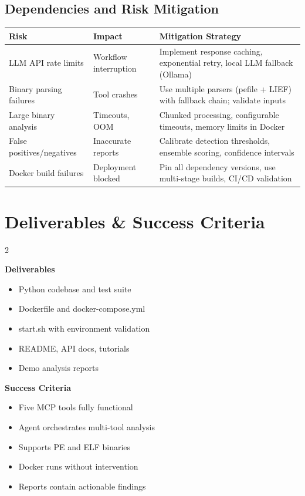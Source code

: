 \documentclass[11pt,a4paper]{article}
\begin{document}
\subsection{Dependencies and Risk Mitigation}

\begin{table}[H]
\centering\small
\begin{tabularx}{\textwidth}{l l X}
\toprule
\textbf{Risk} & \textbf{Impact} & \textbf{Mitigation Strategy} \\
\midrule
LLM API rate limits & Workflow interruption & Implement response caching, exponential retry, local LLM fallback (Ollama) \\
Binary parsing failures & Tool crashes & Use multiple parsers (pefile + LIEF) with fallback chain; validate inputs \\
Large binary analysis & Timeouts, OOM & Chunked processing, configurable timeouts, memory limits in Docker \\
False positives/negatives & Inaccurate reports & Calibrate detection thresholds, ensemble scoring, confidence intervals \\
Docker build failures & Deployment blocked & Pin all dependency versions, use multi-stage builds, CI/CD validation \\
\bottomrule
\end{tabularx}
\end{table}

\section{Deliverables \& Success Criteria}

\begin{multicols}{2}

\noindent\textbf{Deliverables}
\begin{itemize}
  \item Python codebase and test suite
  \item Dockerfile and docker-compose.yml
  \item start.sh with environment validation
  \item README, API docs, tutorials
  \item Demo analysis reports
\end{itemize}

\columnbreak

\noindent\textbf{Success Criteria}
\begin{itemize}
  \item[$\square$] Five MCP tools fully functional
  \item[$\square$] Agent orchestrates multi-tool analysis
  \item[$\square$] Supports PE and ELF binaries
  \item[$\square$] Docker runs without intervention
  \item[$\square$] Reports contain actionable findings
\end{itemize}

\end{multicols}
\end{document}
